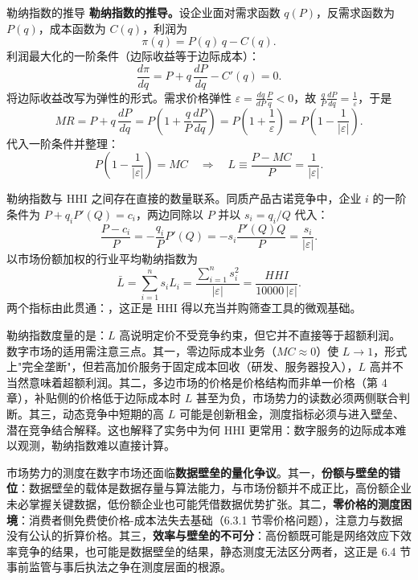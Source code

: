 \begin{derivation}{勒纳指数的推导}{}
\textbf{勒纳指数的推导。}设企业面对需求函数 $q(P)$，反需求函数为 $P(q)$，成本函数为 $C(q)$，利润为
\[
\pi(q) = P(q)\, q - C(q).
\]
利润最大化的一阶条件（边际收益等于边际成本）：
\[
\frac{d\pi}{dq} = P + q\, \frac{dP}{dq} - C'(q) = 0.
\]
将边际收益改写为弹性的形式。需求价格弹性 $\varepsilon = \frac{dq}{dP} \frac{P}{q} < 0$，故 $\frac{q}{P} \frac{dP}{dq} = \frac{1}{\varepsilon}$，于是
\[
MR = P + q\, \frac{dP}{dq} = P\left(1 + \frac{q}{P} \frac{dP}{dq}\right) = P\left(1 + \frac{1}{\varepsilon}\right) = P\left(1 - \frac{1}{|\varepsilon|}\right).
\]
代入一阶条件并整理：
\[
P\left(1 - \frac{1}{|\varepsilon|}\right) = MC \quad\Rightarrow\quad L \equiv \frac{P - MC}{P} = \frac{1}{|\varepsilon|}.
\]

勒纳指数与 HHI 之间存在直接的数量联系。同质产品古诺竞争中，企业 $i$ 的一阶条件为 $P + q_i P'(Q) = c_i$，两边同除以 $P$ 并以 $s_i = q_i / Q$ 代入：
\[
\frac{P - c_i}{P} = - \frac{q_i}{P} P'(Q) = - s_i \frac{P'(Q) Q}{P} = \frac{s_i}{|\varepsilon|}.
\]
以市场份额加权的行业平均勒纳指数为
\[
\bar L = \sum_{i=1}^{n} s_i L_i = \frac{\sum_{i=1}^{n} s_i^2}{|\varepsilon|} = \frac{HHI}{10000\, |\varepsilon|}.
\]
两个指标由此贯通：，这正是 HHI 得以充当并购筛查工具的微观基础。
\end{derivation}

勒纳指数度量的是：$L$ 高说明定价不受竞争约束，但它并不直接等于超额利润。数字市场的适用需注意三点。其一，零边际成本业务（$MC \approx 0$）使 $L \to 1$，形式上"完全垄断"，但若高加价服务于固定成本回收（研发、服务器投入），$L$ 高并不当然意味着超额利润。其二，多边市场的价格是价格结构而非单一价格（第 4 章），补贴侧的价格低于边际成本时 $L$ 甚至为负，市场势力的读数必须两侧联合判断。其三，动态竞争中短期的高 $L$ 可能是创新租金，测度指标必须与进入壁垒、潜在竞争结合解释。这也解释了实务中为何 HHI 更常用：数字服务的边际成本难以观测，勒纳指数难以直接计算。

市场势力的测度在数字市场还面临\textbf{数据壁垒的量化争议}。其一，\textbf{份额与壁垒的错位}：数据壁垒的载体是数据存量与算法能力，与市场份额并不成正比，高份额企业未必掌握关键数据，低份额企业也可能凭借数据优势扩张。其二，\textbf{零价格的测度困境}：消费者侧免费使价格-成本法失去基础（6.3.1 节零价格问题），注意力与数据没有公认的折算价格。其三，\textbf{效率与壁垒的不可分}：高份额既可能是网络效应下效率竞争的结果，也可能是数据壁垒的结果，静态测度无法区分两者，这正是 6.4 节事前监管与事后执法之争在测度层面的根源。

